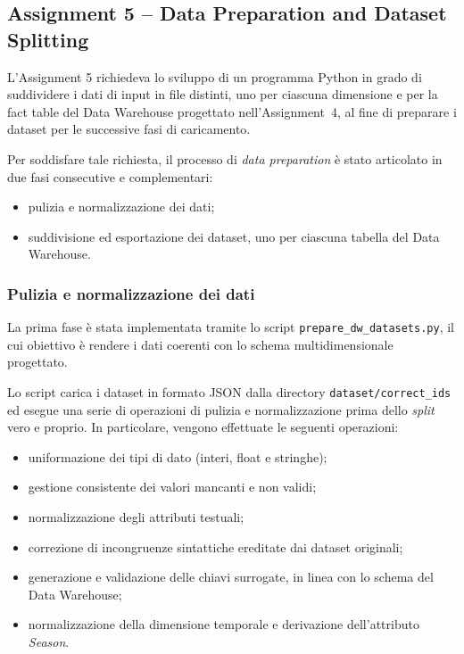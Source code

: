 \subsection*{Assignment 5 -- Data Preparation and Dataset Splitting}

L’Assignment 5 richiedeva lo sviluppo di un programma Python in grado di
suddividere i dati di input in file distinti, uno per ciascuna dimensione
e per la fact table del Data Warehouse progettato nell’Assignment~4,
al fine di preparare i dataset per le successive fasi di caricamento.

Per soddisfare tale richiesta, il processo di \textit{data preparation}
è stato articolato in due fasi consecutive e complementari:
\begin{itemize}
    \item pulizia e normalizzazione dei dati;
    \item suddivisione ed esportazione dei dataset, uno per ciascuna tabella
    del Data Warehouse.
\end{itemize}

\subsubsection*{Pulizia e normalizzazione dei dati}

La prima fase è stata implementata tramite lo script
\texttt{prepare\_dw\_datasets.py}, il cui obiettivo è rendere i dati coerenti
con lo schema multidimensionale progettato.

Lo script carica i dataset in formato JSON dalla directory
\texttt{dataset/correct\_ids} ed esegue una serie di operazioni di pulizia
e normalizzazione prima dello \textit{split} vero e proprio.
In particolare, vengono effettuate le seguenti operazioni:
\begin{itemize}
    \item uniformazione dei tipi di dato (interi, float e stringhe);
    \item gestione consistente dei valori mancanti e non validi;
    \item normalizzazione degli attributi testuali;
    \item correzione di incongruenze sintattiche ereditate dai dataset originali;
    \item generazione e validazione delle chiavi surrogate, in linea con lo schema
    del Data Warehouse;
    \item normalizzazione della dimensione temporale e derivazione
    dell’attributo \textit{Season}.
\end{itemize}

